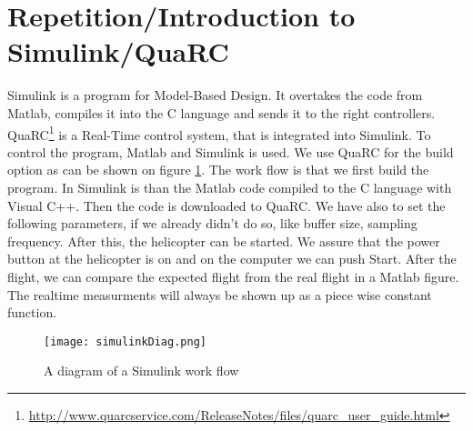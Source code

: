 \section{Repetition/Introduction to Simulink/QuaRC}\label{sec:prob1}

Simulink is a program for Model-Based Design. It overtakes the code from Matlab, compiles it into the C language and sends it to the right controllers. QuaRC\footnote{\url{http://www.quarcservice.com/ReleaseNotes/files/quarc_user_guide.html}} is a Real-Time control system, that is integrated into Simulink. To control the program, Matlab and Simulink is used. We use QuaRC for the build option as can be shown on figure \ref{fig:simDiag}. 
The work flow is that we first build the program. In Simulink is than the Matlab code compiled to the C language with Visual C++. Then the code is downloaded to QuaRC. We have also to set the following parameters, if we already didn't do so, like buffer size, sampling frequency. After this, the helicopter can be started. We assure that the power button at the helicopter is on and on the computer we can push Start. After the flight, we can compare the expected flight from the real flight in a Matlab figure. The realtime measurments will always be shown up as a piece wise constant function. 

\begin{figure}[H]
	\texttt{[image: simulinkDiag.png]}
	\caption{A diagram of a Simulink work flow \citep{NTNU2014}}
	\label{fig:simDiag}
\end{figure} 
